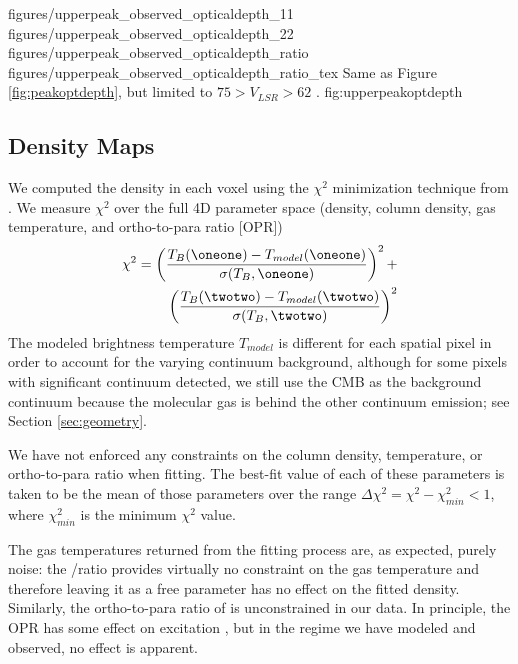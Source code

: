 \FigureFourPDF
{figures/upperpeak_observed_opticaldepth_11}
{figures/upperpeak_observed_opticaldepth_22}
{figures/upperpeak_observed_opticaldepth_ratio}
{figures/upperpeak_observed_opticaldepth_ratio_tex}
{Same as Figure \ref{fig:peakoptdepth}, but limited to $75 > V_{LSR} > 62$ \kms.}
{fig:upperpeakoptdepth}

\subsection{Density Maps}
\label{sec:densmaps}
We computed the density in each voxel using the $\chi^2$ minimization technique
from \citet{Ginsburg2011a}.  We measure $\chi^2$ over the full 4D parameter
space (density, column density, gas temperature,
and ortho-to-para ratio [OPR])
\begin{equation}
    \begin{split}
    \label{eqn:chi2}
    \chi^2 =  \left( \frac{T_B(\oneone)-T_{model}(\oneone)}{\sigma(T_B,\oneone)}\right)^2 +\\
              \left( \frac{T_B(\twotwo)-T_{model}(\twotwo)}{\sigma(T_B,\twotwo)}\right)^2
    \end{split}
\end{equation}
The modeled brightness temperature $T_{model}$ is different for each spatial
pixel in order to account for the varying continuum background, although for
some pixels with significant
continuum detected, we still use the CMB as the background continuum because
the molecular gas is behind the other continuum emission; see Section
\ref{sec:geometry}.

We have not enforced any constraints on the column density,
temperature, or ortho-to-para ratio when fitting.  The best-fit value of each
of these parameters is taken to be the mean of those parameters over the range
$\Delta \chi^2 = \chi^2 - \chi^2_{min} < 1$, where $\chi^2_{min}$ is the
minimum $\chi^2$ value.

The gas temperatures returned from the fitting process are, as expected, purely
noise: the \formaldehyde \oneone/\twotwo ratio provides virtually no constraint
on the gas temperature and therefore leaving it as a free parameter has no
effect on the fitted density.  Similarly, the ortho-to-para ratio of \hh is
unconstrained in our data.  In principle, the \hh OPR has some effect on
\formaldehyde excitation \citep{Troscompt2009a}, but in the regime we have
modeled and observed, no effect is apparent.


